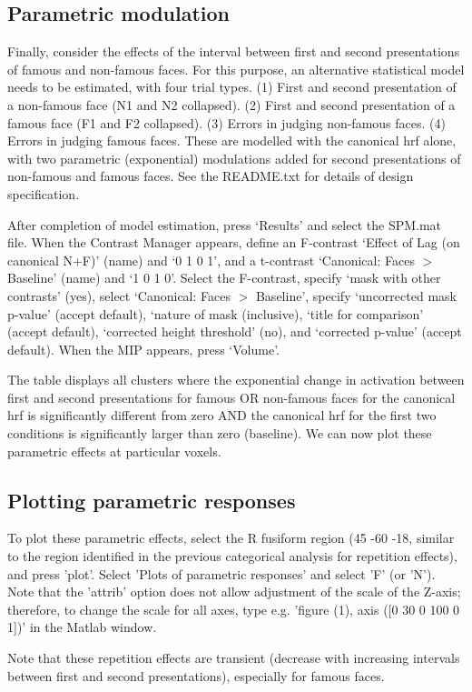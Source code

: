 \documentclass[a4paper,titlepage]{book}
\begin{document}
\subsection{Parametric modulation}

Finally, consider the effects of the interval between first and second presentations of famous and non-famous faces. For this purpose, an alternative statistical model needs to be estimated, with four trial types. (1) First and second presentation of a non-famous face (N1 and N2 collapsed). (2) First and second presentation of a famous face (F1 and F2 collapsed). (3) Errors in judging non-famous faces. (4) Errors in judging famous faces. These are modelled with the canonical hrf alone, with two parametric (exponential) modulations added for second presentations of non-famous and famous faces. See the README.txt for details of design specification.

After completion of model estimation, press `Results' and select the SPM.mat file. When the Contrast Manager appears, define an F-contrast `Effect of Lag (on canonical N+F)' (name) and `0 1 0 1', and a t-contrast `Canonical: Faces $>$ Baseline' (name) and `1 0 1 0'. Select the F-contrast, specify `mask with other contrasts' (yes), select `Canonical: Faces $>$ Baseline', specify `uncorrected mask p-value' (accept default), `nature of mask (inclusive), `title for comparison' (accept default), `corrected height threshold' (no), and `corrected p-value' (accept default). When the MIP appears, press `Volume'.

The table displays all clusters where the exponential change in activation between first and second presentations for famous OR non-famous faces for the canonical hrf is significantly different from zero AND the canonical hrf for the first two conditions is significantly larger than zero (baseline). We can now 
plot these parametric effects at particular voxels.

\subsection{Plotting parametric responses}

To plot these parametric effects, select the R fusiform region (45 -60 -18, similar to the region identified in the previous categorical analysis for repetition effects), and press 'plot'. Select 'Plots of parametric responses' and select 'F' (or 'N').  Note that the 'attrib' option does not allow adjustment of the scale of the Z-axis; therefore, to change the scale for all axes, type e.g. 'figure (1), axis ([0 30 0 100 0 1])' in the Matlab window.

Note that these repetition effects are transient (decrease with increasing intervals between first and second presentations), especially for famous faces.
\end{document}
